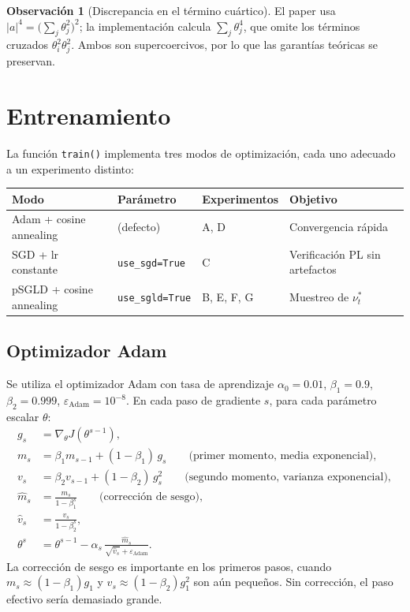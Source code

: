 \documentclass[11pt, a4paper]{article}
\theoremstyle{definition}
\newtheorem{remark}{Observación}[section]
\newcommand{\eps}{\varepsilon}
\begin{document}
\begin{remark}[Discrepancia en el término cuártico]
  El paper usa $|a|^4 = \bigl(\sum_j\theta_j^2\bigr)^2$; la implementación
  calcula $\sum_j\theta_j^4$, que omite los términos cruzados $\theta_i^2\theta_j^2$.
  Ambos son supercoercivos, por lo que las garantías teóricas se preservan.
\end{remark}

\section{Entrenamiento}
\label{sec:entrenamiento}

La función \texttt{train()} implementa tres modos de optimización, cada uno
adecuado a un experimento distinto:

\begin{center}
\begin{tabular}{llll}
\toprule
Modo & Parámetro & Experimentos & Objetivo \\
\midrule
Adam + cosine annealing & (defecto) & A, D & Convergencia rápida \\
SGD + lr constante & \texttt{use\_sgd=True} & C & Verificación PL sin artefactos \\
pSGLD + cosine annealing & \texttt{use\_sgld=True} & B, E, F, G & Muestreo de $\nu_t^*$ \\
\bottomrule
\end{tabular}
\end{center}

\subsection{Optimizador Adam}
\label{sec:adam}

Se utiliza el optimizador Adam \cite{kingma2015adam} con tasa de aprendizaje
$\alpha_0 = 0.01$, $\beta_1 = 0.9$, $\beta_2 = 0.999$, $\eps_{\text{Adam}} = 10^{-8}$.
En cada paso de gradiente $s$, para cada parámetro escalar $\theta$:
\begin{align}
  g_s &= \nabla_\theta J(\theta^{s-1}), \\
  m_s &= \beta_1 m_{s-1} + (1 - \beta_1)\, g_s
        \qquad \text{(primer momento, media exponencial)}, \\
  v_s &= \beta_2 v_{s-1} + (1 - \beta_2)\, g_s^2
        \qquad \text{(segundo momento, varianza exponencial)}, \\
  \hat{m}_s &= \frac{m_s}{1 - \beta_1^s}
        \qquad \text{(corrección de sesgo)}, \\
  \hat{v}_s &= \frac{v_s}{1 - \beta_2^s}, \\
  \theta^s &= \theta^{s-1} - \alpha_s\, \frac{\hat{m}_s}{\sqrt{\hat{v}_s} + \eps_{\text{Adam}}}.
\end{align}
La corrección de sesgo es importante en los primeros pasos, cuando
$m_s \approx (1-\beta_1)g_1$ y $v_s \approx (1-\beta_2)g_1^2$ son aún
pequeños. Sin corrección, el paso efectivo sería demasiado grande.
\end{document}

